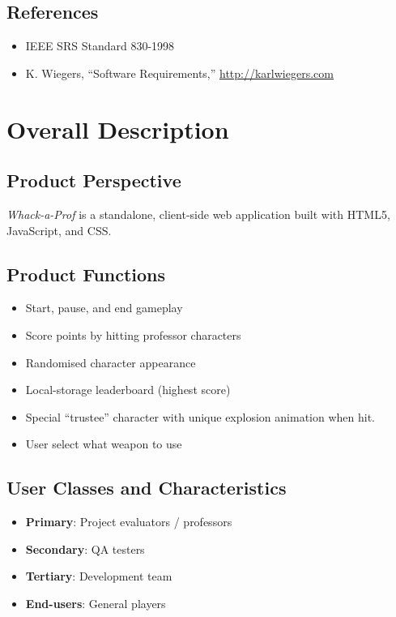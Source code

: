 \documentclass[11pt]{scrreprt}
\newcommand*{\product}{\textit{Whack-a-Prof}\xspace}
\begin{document}
\section{References}
\begin{itemize}
  \item IEEE SRS Standard 830-1998
  \item K. Wiegers, “Software Requirements,” \url{http://karlwiegers.com}
\end{itemize}

\chapter{Overall Description}

\section{Product Perspective}
\product is a standalone, client-side web application built with HTML5, JavaScript, and CSS.

\section{Product Functions}
\begin{itemize}
  \item Start, pause, and end gameplay
  \item Score points by hitting professor characters
  \item Randomised character appearance
  \item Local-storage leaderboard (highest score)
  \item Special “trustee” character with unique explosion animation when hit.
  \item User select what weapon to use
\end{itemize}

\section{User Classes and Characteristics}
\begin{itemize}
  \item \textbf{Primary}: Project evaluators / professors
  \item \textbf{Secondary}: QA testers
  \item \textbf{Tertiary}: Development team
  \item \textbf{End-users}: General players
\end{itemize}
\end{document}
